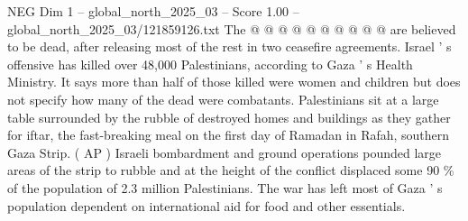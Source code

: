 \begin{textsample}{NEG Dim 1 – global\_north\_2025\_03 – Score 1.00 – global\_north\_2025\_03/121859126.txt}
The @ @ @ @ @ @ @ @ @ @ are believed to be dead, after releasing most of the rest in two ceasefire agreements.
Israel ' s offensive has killed over 48,000 Palestinians, according to Gaza ' s Health Ministry.
It says more than half of those killed were women and children but does not specify how many of the dead were combatants.
Palestinians sit at a large table surrounded by the rubble of destroyed homes and buildings as they gather for iftar, the fast-breaking meal on the first day of Ramadan in Rafah, southern Gaza Strip. ( AP ) Israeli bombardment and ground operations pounded large areas of the strip to rubble and at the height of the conflict displaced some 90 \% of the population of 2.3 million Palestinians.
The war has left most of Gaza ' s population dependent on international aid for food and other essentials.

\end{textsample}
